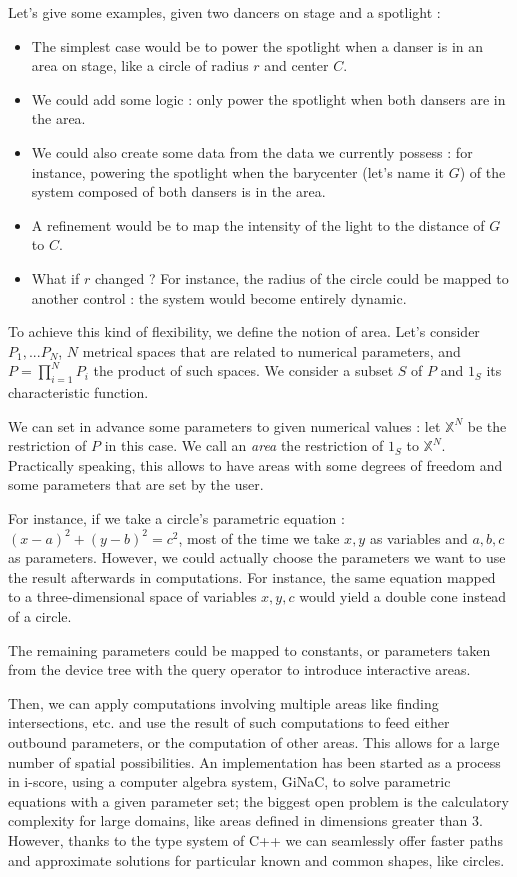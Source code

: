 \documentclass{sigchi}
\begin{document}
Let's give some examples, given two dancers on stage and a spotlight : 
\begin{itemize}
	\item The simplest case would be to power the spotlight when a danser is in an area on stage, like a circle of radius $r$ and center $C$.
	\item We could add some logic : only power the spotlight when both dansers are in the area.
	\item We could also create some data from the data we currently possess : for instance, powering the spotlight when the barycenter (let's name it $G$) of the system composed of both dansers is in the area.
	\item A refinement would be to map the intensity of the light to the distance of $G$ to $C$.
	\item What if $r$ changed ? For instance, the radius of the circle could be mapped to another control : the system would become entirely dynamic.
\end{itemize}

To achieve this kind of flexibility, we define the notion of area. Let's consider $P_1, ... P_N$, $N$ metrical spaces that are related to numerical parameters, and $P = \prod\limits^N_{i=1}P_i$ the product of such spaces. We consider a subset $S$ of $P$ and $1_S$ its characteristic function. 

We can set in advance some parameters to given numerical values : let $\mathbb{X}^N$ be the restriction of $P$ in this case. We call an \textit{area} the restriction of $1_S$ to $\mathbb{X}^N$. Practically speaking, this allows to have areas with some degrees of freedom and some parameters that are set by the user.

For instance, if we take a circle's parametric equation : $(x - a)^2 + (y - b)^2 = c^2$, most of the time we take $x, y$ as variables and $a, b, c$ as parameters. However, we could actually choose the parameters we want to use the result afterwards in computations. For instance, the same equation mapped to a three-dimensional space of variables $x, y, c$ would yield a double cone instead of a circle.

The remaining parameters could be mapped to constants, or parameters taken from the device tree with the query operator to introduce interactive areas.

Then, we can apply computations involving multiple areas like finding intersections, etc. and use the result of such computations to feed either outbound parameters, or the computation of other areas. This allows for a large number of spatial possibilities. An implementation has been started as a process in i-score, using a computer algebra system, GiNaC\cite{bauer2002introduction}, to solve parametric equations with a given parameter set; the biggest open problem is the calculatory complexity for large domains, like areas defined in dimensions greater than 3. However, thanks to the type system of C++ we can seamlessly offer faster paths and approximate solutions for particular known and common shapes, like circles.
\end{document}
